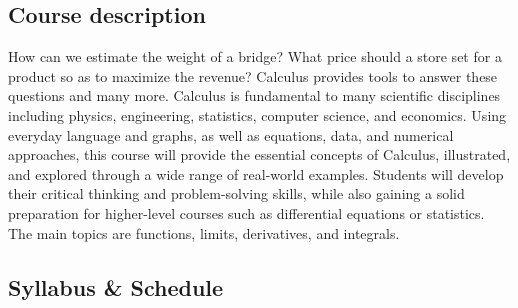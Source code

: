 \documentclass[
]{article}
\begin{document}
\subsection*{Course description}\label{course-description}

How can we estimate the weight of a bridge? What price should a store set for a product so as to maximize the revenue? Calculus provides tools to answer these questions and many more. Calculus is fundamental to many scientific disciplines including physics, engineering, statistics, computer science, and economics. Using everyday language and graphs, as well as equations, data, and numerical approaches, this course will provide the essential concepts of Calculus, illustrated, and explored through a wide range of real-world examples. Students will develop their critical thinking and problem-solving skills, while also gaining a solid preparation for higher-level courses such as differential equations or statistics. The main topics are functions, limits, derivatives, and integrals.

\subsection*{Syllabus \& Schedule}\label{syllabus-schedule}
\end{document}
